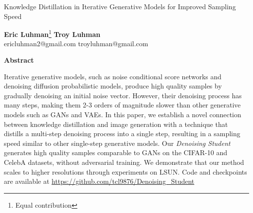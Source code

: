 \documentclass[12pt,a4paper]{article}
\renewcommand{\thefootnote}{\fnsymbol{footnote}}
\begin{document}
\begin{center}
\begin{huge}
Knowledge Distillation in Iterative Generative Models for Improved Sampling Speed\\
\end{huge}
\end{center}

\vspace{0.25cm}

\begin{center}
\begin{large}

\textbf{Eric Luhman}\footnote{\label{note0}Equal contribution} \hspace{4cm} \textbf{Troy Luhman}\footnotemark[1] \\
ericluhman2@gmail.com \hspace{4cm} troyluhman@gmail.com
\end{large}
\end{center}
\vspace{0.25cm}

\renewcommand{\thefootnote}{\arabic{footnote}}
\setcounter{footnote}{0}





\begin{center}
\textbf{Abstract}
\\

\end{center}
\begin{changemargin}{1.75cm}{1.75cm} 
Iterative generative models, such as noise conditional score networks and denoising diffusion probabilistic models, produce high quality samples by gradually denoising an initial noise vector. However, their denoising process has many steps, making them 2-3 orders of magnitude slower than other generative models such as GANs and VAEs. In this paper, we establish a novel connection between knowledge distillation and image generation with a technique that distills a multi-step denoising process into a single step, resulting in a sampling speed similar to other single-step generative models. Our \textit{Denoising Student} generates high quality samples comparable to GANs on the CIFAR-10 and CelebA datasets, without adversarial training. We demonstrate that our method scales to higher resolutions through experiments on  LSUN. Code and checkpoints are available at \url{https://github.com/tcl9876/Denoising_Student}


\end{changemargin}
\end{document}
